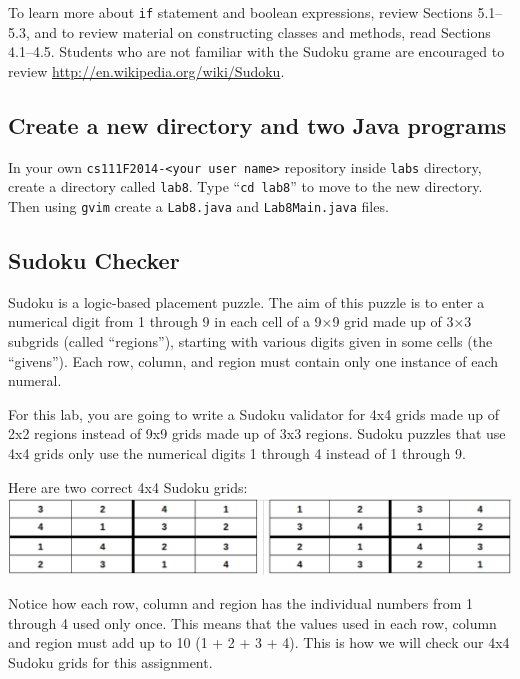 To learn more about {\tt if} statement and boolean expressions, review Sections 5.1--5.3, and to review material on
constructing classes and methods, read Sections 4.1--4.5.  Students who are not familiar with the Sudoku grame are
encouraged to review \url{http://en.wikipedia.org/wiki/Sudoku}.

\vspace{-0.1in}
\subsection*{Create a new directory and two Java programs}
\vspace{-0.05in}
In your own {\tt cs111F2014-<your user name>} repository inside {\tt labs} directory, create a directory called {\tt lab8}. Type ``{\tt cd lab8}'' to move to the new directory. Then using {\tt gvim} create a {\tt Lab8.java} and {\tt Lab8Main.java} files.

\vspace{-0.1in}
\subsection*{Sudoku Checker}
\vspace{-0.05in}
Sudoku is a logic-based placement puzzle. The aim of this puzzle is to enter a numerical digit from 1 through 9 in each cell of a 9×9 grid made up of 3×3 subgrids (called ``regions''), starting with various digits given in some cells (the ``givens''). Each row, column, and region must contain only one instance of each numeral.

\noindent For this lab, you are going to write a Sudoku validator for 4x4 grids made up of 2x2 regions instead of 9x9 grids made up of 3x3 regions.  Sudoku puzzles that use 4x4 grids only use the numerical digits 1 through 4 instead of 1 through 9.

\noindent Here are two correct 4x4 Sudoku grids:\\
\includegraphics[scale=0.3]{grids}

\noindent Notice how each row, column and region has the individual numbers from 1 through 4 used only once.  This means that the values used in each row, column and region must add up to 10 (1 + 2 + 3 + 4).  This is how we will check our 4x4 Sudoku grids for this assignment.


